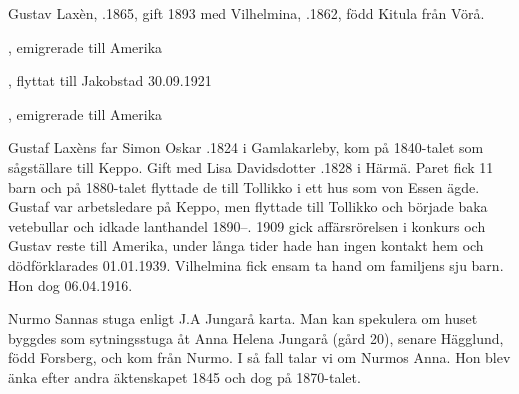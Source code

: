 %
Gustav Laxèn, .1865, gift 1893 med Vilhelmina, .1862, född Kitula från Vörå.
\begin{jhchildren}
  \item {}
  \item {}, emigrerade till Amerika
  \item {}
  \item {}
  \item {}, flyttat till Jakobstad 30.09.1921
  \item {}
  \item {}, emigrerade till Amerika
\end{jhchildren}
Gustaf Laxèns far Simon Oskar .1824 i Gamlakarleby, kom på 1840-talet som sågställare till Keppo. Gift med Lisa Davidsdotter .1828 i Härmä. Paret fick 11 barn och på 1880-talet flyttade de 	till Tollikko i ett hus som von Essen ägde. Gustaf var arbetsledare på Keppo, men flyttade till Tollikko och började baka vetebullar och idkade lanthandel 1890--. 1909 gick affärsrörelsen i konkurs och Gustav reste till Amerika, under långa tider hade han ingen 	kontakt hem och dödförklarades 01.01.1939. Vilhelmina fick ensam ta hand om familjens sju barn. Hon dog 06.04.1916.



%

\jhnooccupant{}

Nurmo Sannas stuga enligt J.A Jungarå karta. Man kan spekulera om huset byggdes som sytningsstuga åt Anna Helena Jungarå (gård 20), senare Hägglund, född Forsberg, och kom från Nurmo. I så fall talar vi om Nurmos Anna. Hon blev änka efter andra äktenskapet 1845 och dog på 1870-talet.



%


